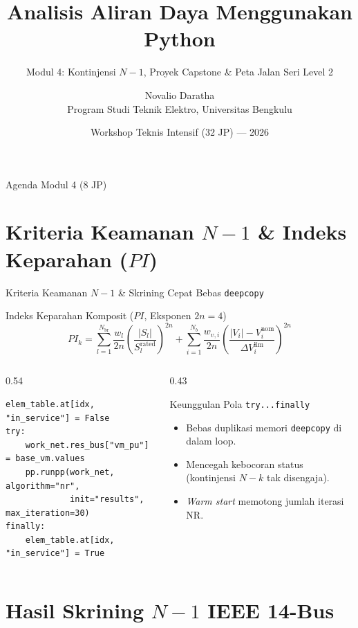 \documentclass[aspectratio=169,10pt]{beamer}
\title[Aliran Daya Python — Modul 4]{Analisis Aliran Daya Menggunakan Python}
\subtitle{Modul 4: Kontinjensi $N-1$, Proyek Capstone \& Peta Jalan Seri Level 2}
\author[Novalio Daratha]{Novalio Daratha\\Program Studi Teknik Elektro, Universitas Bengkulu}
\date{Workshop Teknis Intensif (32 JP) — 2026}
\begin{document}
\begin{frame}
  \titlepage
\end{frame}

\begin{frame}{Agenda Modul 4 (8 JP)}
  \tableofcontents
\end{frame}

\section{Kriteria Keamanan $N-1$ \& Indeks Keparahan ($PI$)}

\begin{frame}[fragile]{Kriteria Keamanan $N-1$ \& Skrining Cepat Bebas \texttt{deepcopy}}
  \begin{block}{Indeks Keparahan Komposit ($PI$, Eksponen $2n = 4$)}
    \[
      PI_k = \sum_{l=1}^{N_{\text{br}}} \frac{w_l}{2n}\left(\frac{|S_l|}{S_l^{\text{rated}}}\right)^{2n}
           + \sum_{i=1}^{N_b} \frac{w_{v,i}}{2n}\left(\frac{|V_i| - V_i^{\text{nom}}}{\Delta V_i^{\text{lim}}}\right)^{2n}
    \]
  \end{block}
  \begin{columns}[T]
    \begin{column}{0.54\textwidth}
\begin{lstlisting}
elem_table.at[idx, "in_service"] = False
try:
    work_net.res_bus["vm_pu"] = base_vm.values
    pp.runpp(work_net, algorithm="nr",
             init="results", max_iteration=30)
finally:
    elem_table.at[idx, "in_service"] = True
\end{lstlisting}
    \end{column}
    \begin{column}{0.43\textwidth}
      \begin{alertblock}{Keunggulan Pola \texttt{try...finally}}
        \begin{itemize}
          \item Bebas duplikasi memori \texttt{deepcopy} di dalam loop.
          \item Mencegah kebocoran status (kontinjensi $N-k$ tak disengaja).
          \item \textit{Warm start} memotong jumlah iterasi NR.
        \end{itemize}
      \end{alertblock}
    \end{column}
  \end{columns}
\end{frame}

\section{Hasil Skrining $N-1$ IEEE 14-Bus}
\end{document}
